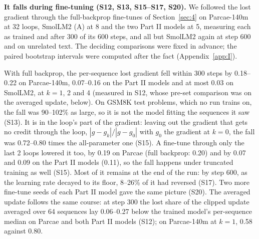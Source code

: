 \documentclass[10pt]{article}
\begin{document}
\textbf{It falls during fine-tuning (S12, S13, S15--S17, S20).} We followed the lost gradient through the full-backprop fine-tunes of Section~\ref{sec:4} on Parcae-140m at 32 loops, SmolLM2 (A) at 8 and the two Part II models at 5, measuring each as trained and after 300 of its 600 steps, and all but SmolLM2 again at step 600 and on unrelated text. The deciding comparisons were fixed in advance; the paired bootstrap intervals were computed after the fact (Appendix~\ref{app:I}).

\begin{table}[t]
\centering\small
\caption{The lost gradient during fine-tuning, on held-out problems (medians over the first 64 GSM8K test problems at $k = 1 / 4$, over all parameters and with the loop-only statistic defined below; after 300 of 600 steps of each fine-tune; S15, S16. Table~\ref{tab:11} adds $k = 2$).}
\label{tab:3}
\end{table}


With full backprop, the per-sequence lost gradient fell within 300 steps by 0.18--0.22 on Parcae-140m, 0.07--0.16 on the Part II models and at most 0.03 on SmolLM2, at $k = 1$, 2 and 4 (measured in S12, whose pre-set comparison was on the averaged update, below). On GSM8K test problems, which no run trains on, the fall was 90--102\% as large, so it is not the model fitting the sequences it saw (S13). It is in the loop's part of the gradient: leaving out the gradient that gets no credit through the loop, $|g - g_k| / |g - g_0|$ with $g_0$ the gradient at $k = 0$, the fall was 0.72--0.80 times the all-parameter one (S15). A fine-tune through only the last 2 loops lowered it too, by 0.19 on Parcae (full backprop: 0.20) and by 0.07 and 0.09 on the Part II models (0.11), so the fall happens under truncated training as well (S15). Most of it remains at the end of the run: by step 600, as the learning rate decayed to its floor, 8--26\% of it had reversed (S17). Two more fine-tune seeds of each Part II model gave the same picture (S20). The averaged update follows the same course: at step 300 the lost share of the clipped update averaged over 64 sequences lay 0.06--0.27 below the trained model's per-sequence median on Parcae and both Part II models (S12); on Parcae-140m at $k = 1$, 0.58 against 0.80.
\end{document}
